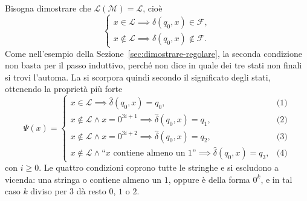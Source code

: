\documentclass[a4paper, 11pt, oneside]{book}
\theoremstyle{formale}
\begin{document}
    Bisogna dimostrare che $\mathcal{L}(\mathcal{M}) = \mathcal{L}$, cio\`e
    \begin{equation*}
        \begin{cases}
            x \in \mathcal{L} \implies \hat{\delta}(q_0, x) \in \mathcal{F}, \\
            x \notin \mathcal{L} \implies \hat{\delta}(q_0, x) \notin \mathcal{F}.
        \end{cases}
    \end{equation*}
    Come nell'esempio della Sezione~\ref{sec:dimostrare-regolare}, la seconda condizione
    non basta per il passo induttivo, perch\'e non dice in quale dei tre stati non finali
    si trovi l'automa. La si scorpora quindi secondo il significato degli stati, ottenendo
    la propriet\`a pi\`u forte
    \begin{equation*}
        \Psi(x) =
        \begin{cases}
            x \in \mathcal{L} \implies \hat{\delta}(q_0, x) = q_0,
                & \text{(1)} \\
            x \notin \mathcal{L} \land x = 0^{3i+1} \implies \hat{\delta}(q_0, x) = q_1,
                & \text{(2)} \\
            x \notin \mathcal{L} \land x = 0^{3i+2} \implies \hat{\delta}(q_0, x) = q_2,
                & \text{(3)} \\
            x \notin \mathcal{L} \land \text{``$x$ contiene almeno un $1$''}
                \implies \hat{\delta}(q_0, x) = q_3,
                & \text{(4)}
        \end{cases}
    \end{equation*}
    con $i \geq 0$. Le quattro condizioni coprono tutte le stringhe e si escludono a
    vicenda: una stringa o contiene almeno un $1$, oppure \`e della forma $0^k$, e in tal
    caso $k$ diviso per $3$ d\`a resto $0$, $1$ o $2$.
\end{document}
